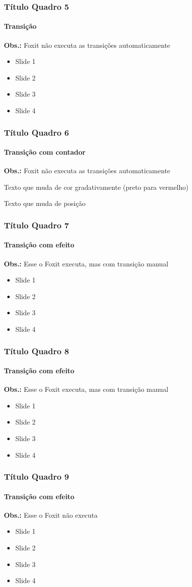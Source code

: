 \documentclass{beamer}
\begin{document}
\begin{frame}
	\frametitle{Título Quadro 5}
	\framesubtitle{Transição}
	
	\textbf{Obs.:} Foxit não executa as transições automaticamente
	\begin{itemize}
		 \item<1->	Slide 1
		 \item<2->	Slide 2
		 \item<3->	Slide 3
		 \item<4->	Slide 4
 	\end{itemize}
\end{frame}


\newcount{\nomeContador}
\newdimen{\nomeDimensao}
\begin{frame}
	\frametitle{Título Quadro 6}
	\framesubtitle{Transição com contador}
	
	\textbf{Obs.:} Foxit não executa as transições automaticamente
	
	
	\textcolor{red! \the\nomeContador !black}{Texto que muda de cor gradativamente (preto para vermelho)}
	
	{\hspace{\nomeDimensao}Texto que muda de posição}
	
\end{frame}

\begin{frame}
	\frametitle{Título Quadro 7}
	\framesubtitle{Transição com efeito}
	
	\textbf{Obs.:} Esse o Foxit executa, mas com transição manual
	
	\begin{itemize}
		\item<1-> Slide 1
		\item<2-> Slide 2
		\item<3-> Slide 3
		\item<4-> Slide 4
	\end{itemize}
\end{frame}

\begin{frame}
	\frametitle{Título Quadro 8}
	\framesubtitle{Transição com efeito}
	
	\textbf{Obs.:} Esse o Foxit executa, mas com transição manual
	
	\transblindsvertical
	\begin{itemize}
		\item<1-> Slide 1
		\item<2-> Slide 2
		\item<3-> Slide 3
		\item<4-> Slide 4
	\end{itemize}
\end{frame}

\begin{frame}
	\frametitle{Título Quadro 9}
	\framesubtitle{Transição com efeito}
	
	\textbf{Obs.:} Esse o Foxit não executa
	
	\transwipe[direction=90]
	\begin{itemize}
		\item Slide 1
		\item Slide 2
		\item Slide 3
		\item Slide 4
	\end{itemize}
\end{frame}
\end{document}
